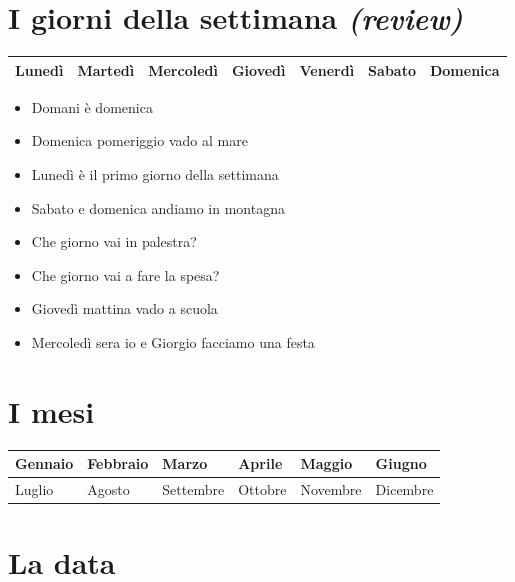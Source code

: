 \documentclass[letter,11pt]{article}
\begin{document}
\vskip 0.4in

\section*{I giorni della settimana \emph{(review)}}
\vskip 0.2in

\begin{tabular}{ |p{2cm}| p{2cm}| p{2cm}| p{2cm}| p{2cm}| p{2cm}| p{2cm}| }

    \hline
    \hline
    Lunedì & Martedì & Mercoledì & Giovedì & Venerdì & Sabato & Domenica\\ \hline
    \hline
\end{tabular}

\vskip 0.2in

\begin{multicols}{2}
\begin{itemize}
    \item Domani è domenica
    \item Domenica pomeriggio vado al mare
    \item Lunedì è il primo giorno della settimana
    \item Sabato e domenica andiamo in montagna
    \item Che giorno vai in palestra?
    \item Che giorno vai a fare la spesa?
    \item Giovedì mattina vado a scuola
    \item Mercoledì sera io e Giorgio facciamo una festa
\end{itemize}
\end{multicols}

\vskip 0.2in

\section*{I mesi}
\vskip 0.2in

\begin{tabular}{ |p{2.2cm}| p{2.2cm}| p{2.2cm}| p{2.2cm}| p{2.2cm}| p{2.2cm}| }

    \hline
    \hline
    Gennaio & Febbraio & Marzo & Aprile & Maggio & Giugno \\ \hline
    Luglio & Agosto & Settembre & Ottobre & Novembre & Dicembre \\ \hline
    \hline
\end{tabular}
\vskip 0.5in

\section*{La data}
\vskip 0.2in
\end{document}
